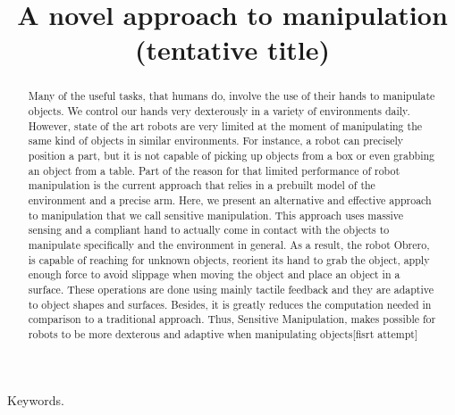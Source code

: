 \documentclass[conference,letterpaper]{IEEEtran}
\begin{document}
\title{\huge A novel approach to manipulation (tentative title)}

\author{
\and
{}
}

\maketitle
\begin{abstract}
Many of the useful tasks, that humans do, involve the use of their
hands to manipulate objects. We control our hands very dexterously
in a variety of environments daily. However, state of the art
robots are very limited at the moment of manipulating the same
kind of objects in similar environments. For instance, a robot can
precisely position a part, but it is not capable of picking up
objects from a box or even grabbing an object from a table. Part
of the reason for that limited performance of robot manipulation
is the current approach that relies in a prebuilt model of the
environment and a precise arm. Here, we present an alternative and
effective approach to manipulation that we call sensitive
manipulation. This approach uses massive sensing and a compliant
hand to actually come in contact with the objects to manipulate
specifically and the environment in general. As a result, the
robot Obrero, is capable of reaching for unknown objects, reorient
its hand to grab the object, apply enough force to avoid slippage
when moving the object and place an object in a surface. These
operations are done using mainly tactile feedback and they are
adaptive to object shapes and surfaces. Besides, it is greatly
reduces the computation needed in comparison to a traditional
approach. Thus, Sensitive Manipulation, makes possible for robots
to be more dexterous and adaptive when manipulating objects[fisrt
attempt]

\end{abstract}

\begin{keywords}
Keywords.
\end{keywords}
%



%


\end{document}
